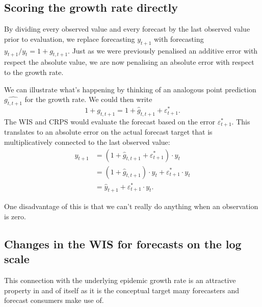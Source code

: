 \documentclass{article}
\begin{document}
\subsection{Scoring the growth rate directly}
By dividing every observed value and every forecast by the last observed value prior to evaluation, we replace forecasting $y_{t+1}$ with forecasting  $y_{t+1} / y_t = 1 + g_{t, t+1}$. Just as we were previously penalised an additive error with respect the absolute value, we are now penalising an absolute error with respect to the growth rate. 

We can illustrate what's happening by thinking of an analogous point prediction $\hat{g_{t, t+1}}$ for the growth rate. We could then write
\begin{equation}
    1 + g_{t, t+1} = 1 + \hat{g}_{t, t+1} + \varepsilon^*_{t+1}. 
\end{equation}
%
The WIS and CRPS would evaluate the forecast based on the error $\varepsilon^*_{t+1}$. This translates to an absolute error on the actual forecast target that is multiplicatively connected to the last observed value: 
\begin{align}
    y_{t+1} &= (1 + \hat{g}_{t, t+1} + \varepsilon^*_{t+1}) \cdot y_t \\
            &= (1 + \hat{g}_{t, t+1}) \cdot y_t + \varepsilon^*_{t+1} \cdot y_t \\
            &= \hat{y}_{t+1} + \varepsilon^*_{t+1} \cdot y_t.
\end{align}

One disadvantage of this is that we can't really do anything when an observation is zero. 


\subsection{Changes in the WIS for forecasts on the log scale} \label{wis-log-derivation}

This connection with the underlying epidemic growth rate is an attractive property in and of itself as it is the conceptual target many forecasters and forecast consumers make use of. 
\end{document}
